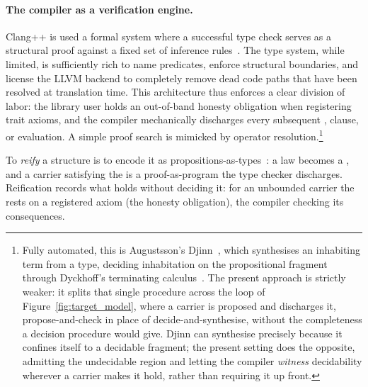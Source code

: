 \documentclass[11pt, a4paper]{article}
\begin{document}
\paragraph{The compiler as a verification engine.}
Clang++ is used a formal system where a successful type check serves as a structural proof against a fixed set of inference rules~\cite{wadler2015propositions}.
The  type system, while limited, is sufficiently rich to name predicates, enforce structural boundaries, and license the LLVM backend to completely remove dead code paths that have been resolved at translation time.
This architecture thus enforces a clear division of labor: the library user holds an out-of-band honesty obligation when registering trait axioms, and the compiler mechanically discharges every subsequent ,  clause, or  evaluation.
A simple proof search is mimicked by operator resolution.\footnote{Fully automated, this is Augustsson's Djinn~\cite{augustsson2005djinn}, which synthesises an inhabiting term from a type, deciding inhabitation on the propositional fragment through Dyckhoff's terminating calculus~\cite{dyckhoff1992contraction}.
The present approach is strictly weaker: it splits that single procedure across the loop of Figure~\ref{fig:target_model}, where a carrier is proposed and  discharges it, propose-and-check in place of decide-and-synthesise, without the completeness a decision procedure would give.
Djinn can synthesise precisely because it confines itself to a decidable fragment; the present setting does the opposite, admitting the undecidable region and letting the compiler \emph{witness} decidability wherever a carrier makes it hold, rather than requiring it up front.}
\begin{definition}[Reification]
\label{def:reification}
To \emph{reify} a structure is to encode it as propositions-as-types~\cite{wadler2015propositions}: a law becomes a , and a carrier satisfying the  is a proof-as-program the type checker discharges.
Reification records what holds without deciding it: for an unbounded carrier the  rests on a registered axiom (the honesty obligation), the compiler checking its consequences.
\end{definition}
\end{document}
